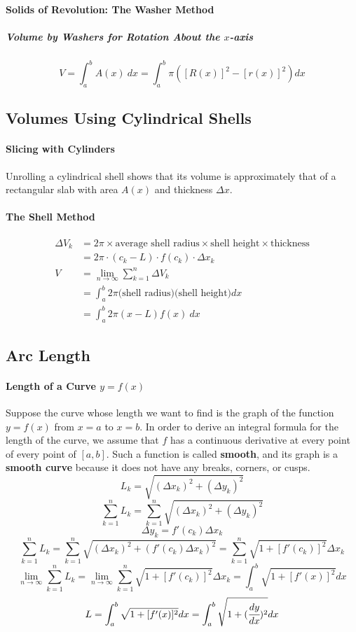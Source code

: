 \documentclass{article}
\begin{document}
            \paragraph{Solids of Revolution: The Washer Method}
                \subparagraph{Volume by Washers for Rotation About the $x$-axis}
                \[V=\int_a^b A(x)\ dx=\int_a^b \pi([R(x)]^2-[r(x)]^2)dx\]
        \subsection{Volumes Using Cylindrical Shells}
            \paragraph{Slicing with Cylinders}
            Unrolling a cylindrical shell shows that its volume is approximately that of a rectangular slab with area $A(x)$ and thickness $\Delta x$.
            \paragraph{The Shell Method}
            \begin{equation}
                \begin{aligned}
                    \Delta V_k&=2\pi \times \text{average shell radius} \times \text{shell height} \times \text{thickness}\\
                    &=2\pi \cdot(c_k-L) \cdot f(c_k)\cdot \Delta x_k\\
                    V&=\lim\limits_{n\to \infty} \sum_{k=1}^n \Delta V_k\\
                    &=\int_a^b 2\pi \text{(shell radius)(shell height)} dx\\
                    &=\int_a^b 2\pi (x-L)f(x)\ dx
                \end{aligned}
            \end{equation}
        \subsection{Arc Length}
            \paragraph{Length of a Curve $y=f(x)$}
                Suppose the curve whose length we want to find is the graph of the function $y=f(x)$ from $x=a$ to $x=b$. In order to derive an integral formula for the length of the curve, we assume that $f$ has a continuous derivative at every point of every point of $[a,b]$. Such a function is called \textbf{smooth}, and its graph is a \textbf{smooth curve} because it does not have any breaks, corners, or cusps.
                \[L_k=\sqrt{(\Delta x_k)^2+(\Delta y_k)^2}\]
                \[\sum_{k=1}^n L_k=\sum_{k=1}^n \sqrt{(\Delta x_k)^2+(\Delta y_k)^2}\]
                \[\Delta y_k=f'(c_k)\Delta x_k\]
                \[\sum_{k=1}^n L_k=\sum_{k=1}^n \sqrt{(\Delta x_k)^2+(f'(c_k)\Delta x_k)^2}=\sum_{k=1}^n \sqrt{1+[f'(c_k)]^2}\Delta x_k\]
                \[\lim\limits_{n\to \infty}\sum_{k=1}^n L_k=\lim\limits_{n\to \infty}\sum_{k=1}^n \sqrt{1+[f'(c_k)]^2}\Delta x_k=\int_a^b \sqrt{1+[f'(x)]^2}dx\]
                \[L=\int_a^b \sqrt{1+[f'(x)]^2}dx=\int_a^b \sqrt{1+(\cfrac{dy}{dx})^2}dx\]
\end{document}
